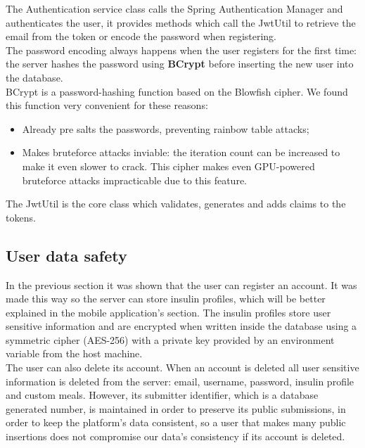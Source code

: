 The Authentication service class calls the Spring Authentication Manager and authenticates the user, it provides methods which call the JwtUtil
to retrieve the email from the token or encode the password when registering.\\

The password encoding always happens when the user registers for the first time: the server hashes the password using \textbf{BCrypt}\cite{bcrypt} before inserting the new
user into the database.\\

BCrypt is a password-hashing function based on the Blowfish\cite{blowfish} cipher. We found this function very convenient for these reasons:
\begin{itemize}
    \item Already pre salts the passwords, preventing rainbow table attacks\cite{rainbowtable};
    \item Makes bruteforce attacks inviable: the iteration count can be increased to make it even slower to crack.
    This cipher makes even GPU-powered bruteforce attacks impracticable due to this feature.
\end{itemize}

The JwtUtil is the core class which validates, generates and adds claims to the tokens.\\

\subsection{User data safety}

In the previous section it was shown that the user can register an account. It was made this way so the server can store
insulin profiles, which will be better explained in the mobile application's section. The insulin profiles store user sensitive
information and are encrypted when written inside the database using a symmetric cipher (AES-256) with a private key provided by an 
environment variable from the host machine.\\

The user can also delete its account. When an account is deleted all user sensitive information is deleted from the server: email,
username, password, insulin profile and custom meals. However, its submitter identifier, which is a database generated number,
is maintained in order to preserve its public submissions, in order to keep the platform's data consistent, so a user that makes many 
public insertions does not compromise our data's consistency if its account is deleted.\\

